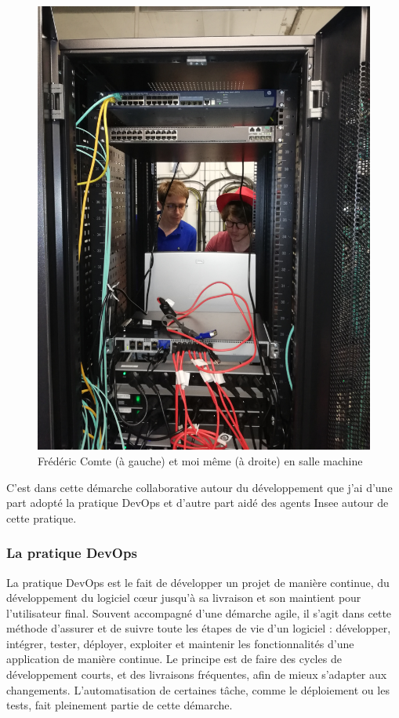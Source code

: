 \begin{figure}[H]
    \centering
    \includegraphics[scale=0.10]{images/salle-machine.jpg}
    \caption{Frédéric Comte (à gauche) et moi même (à droite) en salle machine}
    \label{fig:salle-machine}
\end{figure}
\vspace{10pt}

C'est dans cette démarche collaborative autour du développement que j'ai d'une part adopté la pratique DevOps et d'autre part aidé des agents Insee autour de cette pratique.
\label{section 2.2.2 - Séminaire du développement}

\subsubsection{La pratique DevOps}
La pratique DevOps est le fait de développer un projet de manière continue, du développement du logiciel cœur jusqu'à sa livraison et son maintient pour l'utilisateur final. Souvent accompagné d'une démarche agile, il s'agit dans cette méthode d'assurer et de suivre toute les étapes de vie d'un logiciel : développer, intégrer, tester, déployer, exploiter et maintenir les fonctionnalités d'une application de manière continue. Le principe est de faire des cycles de développement courts, et des livraisons fréquentes, afin de mieux s'adapter aux changements. L'automatisation de certaines tâche, comme le déploiement ou les tests, fait pleinement partie de cette démarche.
\newline


